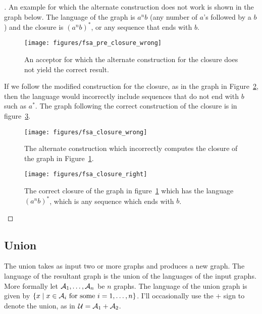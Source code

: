 \begin{proof}[\unskip\nopunct]
An example for which the alternate construction does not work is shown in the
graph below. The language of the graph is $a^nb$ (any number of $a$'s followed
by a $b$) and the closure is $(a^nb)^*$, or any sequence that ends with $b$.

\begin{figure}
    \centering
    \texttt{[image: figures/fsa\_pre\_closure\_wrong]}
    \caption{An acceptor for which the alternate construction for the closure
    does not yield the correct result.}
    \label{fig:fsa_pre_closure_wrong}
\end{figure}

If we follow the modified construction for the closure, as in the graph in
Figure~\ref{fig:fsa_closure_wrong}, then the language would incorrectly
include sequences that do not end with $b$ such as $a^*$. The graph
following the correct construction of the closure is in
figure~\ref{fig:fsa_closure_right}.

\begin{figure}
    \centering
    \texttt{[image: figures/fsa\_closure\_wrong]}
    \caption{The alternate construction which incorrectly computes the closure
    of the graph in Figure~\ref{fig:fsa_pre_closure_wrong}.}
    \label{fig:fsa_closure_wrong}
\end{figure}


\begin{figure}
    \centering
    \texttt{[image: figures/fsa\_closure\_right]}
    \caption{The correct closure of the graph in
    figure~\ref{fig:fsa_pre_closure_wrong} which has the language $(a^nb)^*$, which
    is any sequence which ends with $b$.}
    \label{fig:fsa_closure_right}
\end{figure}

\end{proof}

\subsection{Union}

The union takes as input two or more graphs and produces a new graph. The
language of the resultant graph is the union of the languages of the input
graphs. More formally let $\mathcal{A}_1, \ldots, \mathcal{A}_n$ be $n$ graphs. The language of
the union graph is given by $\{ x \mid x \in \mathcal{A}_i \textrm{ for some } i = 1,
\ldots, n \}$. I'll occasionally use the $+$ sign to denote the union, as in
$\mathcal{U} = \mathcal{A}_1 + \mathcal{A}_2$.

